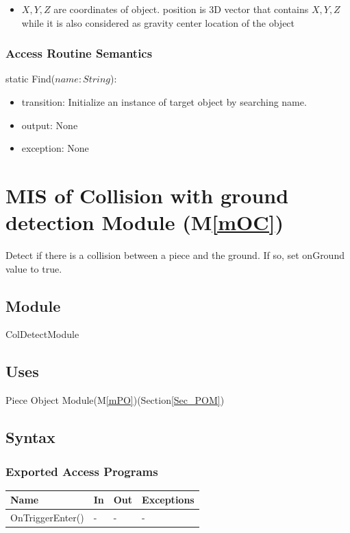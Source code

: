 \documentclass[12pt, titlepage]{article}
\newcommand{\mref}[1]{M\ref{#1}}
\begin{document}
\noindent
\begin{itemize}
	\item $X,Y,Z$ are coordinates of object. position is 3D vector that contains $X,Y,Z$ while it is also considered as gravity center location of the object
\end{itemize}

\subsubsection{Access Routine Semantics}

\noindent static Find($name: String$):
\begin{itemize}
	\item transition: Initialize an instance of target object by searching name.
	\item output: None
	\item exception: None
\end{itemize}


\section{MIS of Collision with ground detection Module (\mref{mOC})}
\label{Sec_CDM}
Detect if there is a collision between a piece and the ground. If so, set onGround
value to true.

\subsection{Module}

ColDetectModule

\subsection{Uses}

Piece Object Module(\mref{mPO})(Section\ref{Sec_POM})

\subsection{Syntax}

\subsubsection{Exported Access Programs}

\begin{center}
	\begin{tabular}{p{4cm} p{4cm} p{4cm} p{2cm}}
		\hline
		\textbf{Name} & \textbf{In} & \textbf{Out} & \textbf{Exceptions} \\
		\hline
		OnTriggerEnter() & - & - & - \\
		\hline
	\end{tabular}
\end{center}
\end{document}
